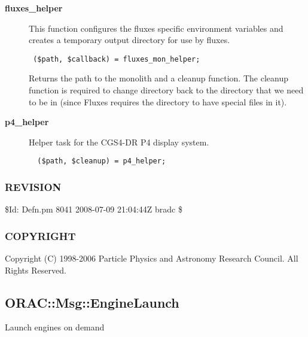 \begin{description}

\item[{\textbf{fluxes\_helper}}] \mbox{}

This function configures the fluxes specific environment variables
and creates a temporary output directory for use by fluxes.

\begin{verbatim}
 ($path, $callback) = fluxes_mon_helper;
\end{verbatim}


Returns the path to the monolith and a cleanup function.
The cleanup function is required to change directory back to the
directory that we need to be in (since Fluxes requires the directory
to have special files in it).


\item[{\textbf{p4\_helper}}] \mbox{}

Helper task for the CGS4-DR P4 display system.

\begin{verbatim}
  ($path, $cleanup) = p4_helper;
\end{verbatim}
\end{description}
\subsubsection*{REVISION\label{ORAC::Inst::Defn_REVISION}}


\$Id: Defn.pm 8041 2008-07-09 21:04:44Z bradc \$

\subsubsection*{COPYRIGHT\label{ORAC::Inst::Defn_COPYRIGHT}}


Copyright (C) 1998-2006 Particle Physics and Astronomy Research
Council. All Rights Reserved.

\subsection{ORAC::Msg::EngineLaunch\label{ORAC::Msg::EngineLaunch}}


Launch engines on demand

